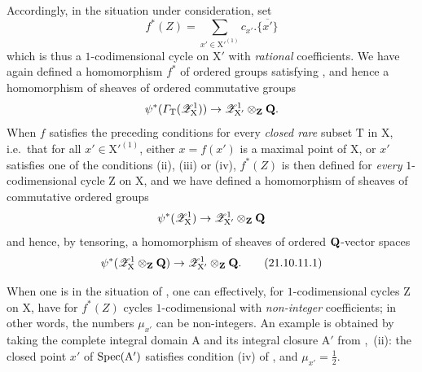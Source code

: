 \begin{env}[21.10.11]
Accordingly, in the situation under consideration, set
\[
  f^*(Z)=\sum_{x'\in\mathrm{X}'^{(1)}} c_{x'}.\overline{\{x'\}}
\]
which is thus a $1$-codimensional cycle on $\mathrm{X}'$ with \emph{rational} coefficients.
We have again defined a homomorphism $f^*$ of ordered groups satisfying , and hence a homomorphism of sheaves of ordered commutative groups
\[
  \psi^*(\varGamma_{\mathrm{T}}(\mathscr{Z}^1_{\mathrm{X}}))\to\mathscr{Z}^1_{\mathrm{X}'}\otimes_{\mathbf{Z}}\mathbf{Q}.
\]
When $f$ satisfies the preceding conditions for every \emph{closed rare} subset $\mathrm{T}$ in $\mathrm{X}$, i.e.\ that for all $x'\in\mathrm{X}'^{(1)}$, either $x=f(x')$ is a maximal point of $\mathrm{X}$, or $x'$ satisfies one of the conditions (ii), (iii) or (iv), $f^*(Z)$ is then defined for \emph{every} $1$-codimensional cycle $\mathrm{Z}$ on $\mathrm{X}$, and we have defined a homomorphism of sheaves of commutative ordered groups
\[
  \psi^*(\mathscr{Z}^1_{\mathrm{X}})\to\mathscr{Z}^1_{\mathrm{X}'}\otimes_{\mathbf{Z}}\mathbf{Q}
\]
and hence, by tensoring, a homomorphism of sheaves of ordered $\mathbf{Q}$-vector spaces
\[
\label{IV.21.10.11.1}
  \psi^*(\mathscr{Z}^1_{\mathrm{X}}\otimes_{\mathbf{Z}}\mathbf{Q})\to\mathscr{Z}^1_{\mathrm{X}'}\otimes_{\mathbf{Z}}\mathbf{Q}.
  \tag{21.10.11.1}
\]
\end{env}

\begin{remark}[21.10.12]
\label{IV.21.10.12}
When one is in the situation of , one can effectively, for $1$-codimensional cycles $\mathrm{Z}$ on $\mathrm{X}$, have for $f^*(Z)$ cycles $1$-codimensional with \emph{non-integer} coefficients; in other words, the numbers $\mu_{x'}$ can be non-integers.
An example is obtained by taking the complete integral domain $\mathrm{A}$ and its integral closure $\mathrm{A}'$ from ,{}~(ii): the closed point $x'$ of $\operatorname{Spec}(\mathrm{A}')$ satisfies condition (iv) of , and $\mu_{x'}=\frac12$.
\end{remark}

